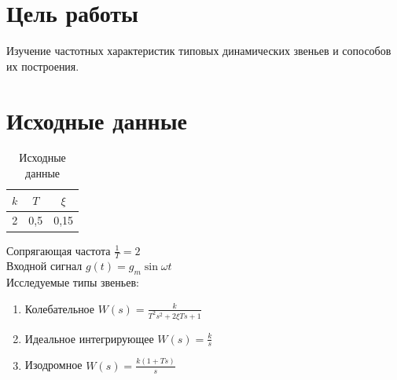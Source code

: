 \documentclass[a4paper, 11pt, russian]{article}
\begin{document}
    
    \section*{Цель работы}
    Изучение частотных характеристик типовых динамических звеньев и сопособов их построения.
    \section*{Исходные данные}
    \begin{table}[h!]
        \flushleft
        \caption{Исходные данные}
        \begin{tabular}{c|c|c}
            $k$ & $T$ & $\xi$ \\
            \hline
            2 & 0,5 & 0,15
        \end{tabular}
    \end{table}
    \flushleft 
    Сопрягающая частота $\displaystyle{\frac{1}{T}} = 2$\\
    Входной сигнал $g(t) = g_m\sin{\omega t}$\\
    Исследуемые типы звеньев:
    \begin{enumerate}
        \item Колебательное $W(s) = \displaystyle{\frac{k}{T^2s^2 + 2\xi Ts + 1}}$
        \item Идеальное интегрирующее $W(s) = \displaystyle{\frac{k}{s}}$
        \item Изодромное $W(s) = \displaystyle{\frac{k(1 + Ts)}{s}}$
    \end{enumerate}
\end{document}
